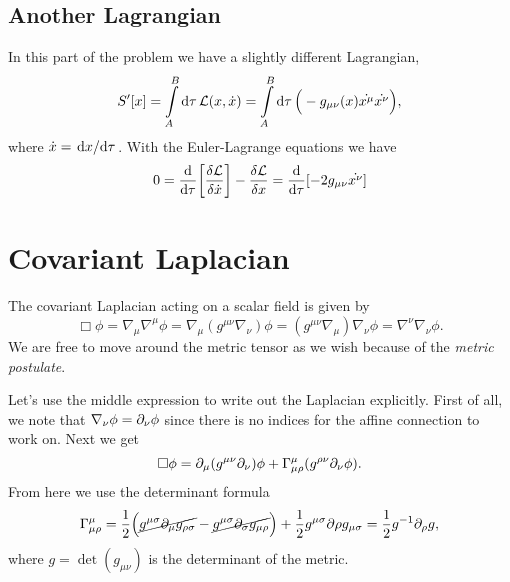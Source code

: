 \documentclass[11pt,a4paper, 
swedish, english %
]{article}
\begin{document}
\subsection{Another Lagrangian}
In this part of the problem we have a slightly different Lagrangian,
\begin{equation}\label{eq5:Lagrangian2}
S'[x]=\int_A^B\rd\tau\,\mathcal{L}(x,\dot{x})
=\int_A^B\rd\tau\,\Big(-g_{\mu\nu}(x)\dot{x^\mu}\dot{x^\nu}\Big),
\end{equation}
where $\dot{x}=\dv*{x}{\tau}$. With the Euler-Lagrange equations we
have
\begin{equation}
0=
\dv{\tau}\qty[\frac{\delta\mathcal{L}}{\delta\dot{x}}]
-\frac{\delta\mathcal{L}}{\delta{x}}
=\dv{\tau}\qty[-2g_{\mu\nu}\dot{x^\nu}]
\end{equation}


\section{Covariant Laplacian}
\swapcommands{\phi}{\varphi}
The covariant Laplacian acting on a scalar field is given by
\begin{equation}
\Box\phi=\nabla_\mu\nabla^\mu\phi=\nabla_\mu(g^{\mu\nu}\nabla_\nu)\phi
=(g^{\mu\nu}\nabla_\mu)\nabla_\nu\phi
=\nabla^\nu\nabla_\nu\phi.
\end{equation}
We are free to move around the metric tensor as we wish because of the
\emph{metric postulate}.

Let's use the middle expression to write out the Laplacian
explicitly. First of all, we note that $\nabla_\nu\phi=\partial_\nu\phi$
since there is no indices for the affine connection to work on. Next
we get
\begin{equation}
\Box\phi=\partial_\mu(g^{\mu\nu}\partial_\nu)\phi
+\Gamma^\mu_{\mu\rho}(g^{\rho\nu}\partial_{\nu}\phi).
\end{equation}
From here we use the determinant formula
\begin{equation}\label{eq:det-formula}
\Gamma^\mu_{\mu\rho}=\frac{1}{2}
\Big(\cancel{g^{\mu\sigma}\partial_\mu g_{\rho\sigma}}
-\cancel{g^{\mu\sigma}\partial_\sigma g_{\mu\rho}} \Big)
+\frac{1}{2}g^{\mu\sigma}\partial\rho g_{\mu\sigma}
=\frac{1}{2}g^{-1}\partial_\rho g,
\end{equation}
where $g=\det(g_{\mu\nu})$ is the determinant of the metric.
\end{document}
